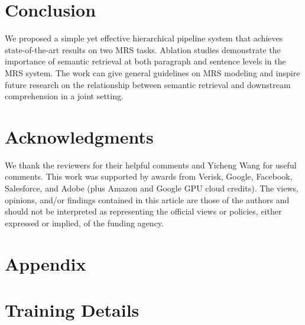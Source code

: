 \documentclass[11pt,a4paper]{article}
\begin{document}
\section{Conclusion}
We proposed a simple yet effective hierarchical pipeline system that achieves state-of-the-art results on two MRS tasks. Ablation studies demonstrate the importance of semantic retrieval at both paragraph and sentence levels in the MRS system. The work can give general guidelines on MRS modeling and inspire future research on the relationship between semantic retrieval and downstream comprehension in a joint setting.

\section*{Acknowledgments}
We thank the reviewers for their helpful comments and Yicheng Wang for useful comments. This work was supported by awards from Verisk, Google, Facebook, Salesforce, and Adobe (plus Amazon and Google GPU cloud credits). The views, opinions, and/or findings contained in this article are those of the authors and should not be interpreted as representing the official views or policies, either expressed or implied, of the funding agency.






\section*{Appendix}
\appendix
\section{Training Details}
\label{sec:training_appendix}

\begin{table}[h]
\centering
\begin{small}
\end{small}
\caption{Hyper-parameter selection for the full pipeline system.  and  are the retrieval filtering hyper-parameters mentioned in the main paper. P-level and S-level indicate paragraph-level and sentence-level respectively. ``\{\}" means values enumerated from a set. ``[]" means values enumerated from a range with interval=0.1 ``BS."=Batch Size ``\# E."=Number of Epochs}
\label{tab:hyper_parameter_pipeline_system}
\end{table}
\end{document}
